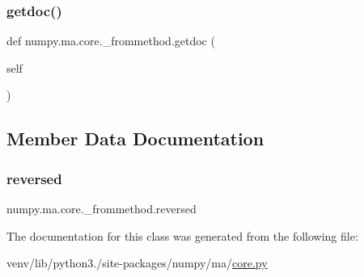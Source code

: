 \mbox{\label{classnumpy_1_1ma_1_1core_1_1__frommethod_a86a72e0184fe7285abc1be435b07ffd9}} 
\subsubsection{\texorpdfstring{getdoc()}{getdoc()}}
{\footnotesize\ttfamily def numpy.\+ma.\+core.\+\_\+frommethod.\+getdoc (\begin{DoxyParamCaption}\item[{}]{self }\end{DoxyParamCaption})}



\subsection{Member Data Documentation}
\mbox{\label{classnumpy_1_1ma_1_1core_1_1__frommethod_abb6a18fdf77efa92a6d1e6a087dd3e52}} 
\subsubsection{\texorpdfstring{reversed}{reversed}}
{\footnotesize\ttfamily numpy.\+ma.\+core.\+\_\+frommethod.\+reversed}



The documentation for this class was generated from the following file\+:\begin{DoxyCompactItemize}
\item 
venv/lib/python3./site-\/packages/numpy/ma/\hyperlink{numpy_2ma_2core_8py}{core.\+py}\end{DoxyCompactItemize}

